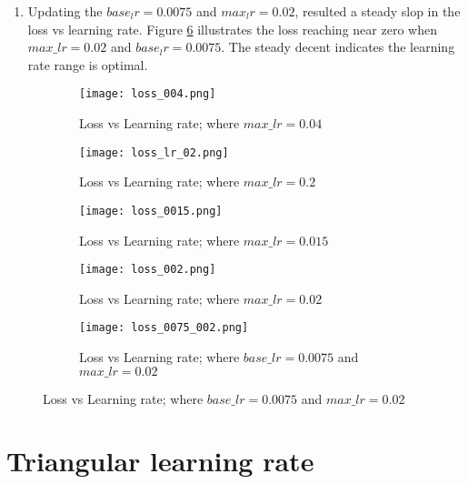 \begin{enumerate}
    \item Updating the $base_lr=0.0075$ and $max_lr=0.02$, resulted a steady slop in the loss vs learning rate.  
    Figure \ref{fig:Loss value at 0.0075} illustrates the loss reaching near zero when $max\_lr = 0.02$ and $base_lr=0.0075$. The steady decent indicates the learning rate range is optimal.
    

\end{enumerate}

\begin{figure}[htbp]
    \centering
    \begin{subfigure}{0.4\textwidth}
        \texttt{[image: loss\_004.png]}
        \caption{Loss vs Learning rate; where $max\_lr = 0.04$}
        \label{fig:Loss value at 0.04}
    \end{subfigure}
    \hfill
    \begin{subfigure}{0.4\textwidth}
       
        \texttt{[image: loss\_lr\_02.png]}
        \caption{Loss vs Learning rate; where $max\_lr = 0.2$}
        \label{fig:Loss value at 0.2}
    \end{subfigure}
    
    \begin{subfigure}{0.4\textwidth}
        \texttt{[image: loss\_0015.png]}
        \caption{Loss vs Learning rate; where $max\_lr = 0.015$}
        \label{fig:Loss value at 0.015}
    \end{subfigure}
    \hfill
    \begin{subfigure}{0.4\textwidth}
        \texttt{[image: loss\_002.png]}
        \caption{Loss vs Learning rate; where $max\_lr = 0.02$}
        \label{fig:Loss value at 0.02}
    \end{subfigure}
     \vspace{1cm} %
     \begin{subfigure}{0.4\textwidth}
         \texttt{[image: loss\_0075\_002.png]}
         \caption{Loss vs Learning rate; where $base\_lr = 0.0075$ and $max\_lr = 0.02$ }
         \label{fig:Loss value at 0.0075}
     \end{subfigure}

\end{figure}

\section{Triangular learning rate}

